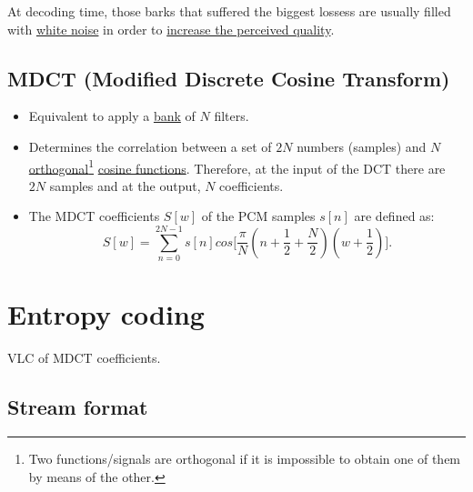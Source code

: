 At decoding time, those barks that suffered the biggest lossess are
usually filled with
\href{http://en.wikipedia.org/wiki/White_noise}{white noise} in order to
\href{http://simplynoise.com/}{increase the perceived
    quality}.

\subsection{MDCT (Modified Discrete Cosine Transform)}
\begin{itemize}
\item
  Equivalent to apply a
  \href{http://en.wikipedia.org/wiki/Filter_bank}{bank} of \(N\)
  filters.
\item
  Determines the correlation between a set of \(2N\) numbers (samples)
  and \(N\)
  \href{http://en.wikipedia.org/wiki/Orthogonality}{orthogonal}\footnote{Two
    functions/signals are orthogonal if it is impossible to obtain one
    of them by means of the other.}
  \href{http://guru.multimedia.cx/mdct/}{cosine functions}. Therefore,
  at the input of the DCT there are \(2N\) samples and at the output,
  \(N\) coefficients.
\item
  The MDCT coefficients \(S[w]\) of the PCM samples \(s[n]\) are defined
  as:
   \begin{equation}
    S[w] = \sum_{n=0}^{2N-1}s[n]cos\Big[\frac{\pi}{N}(n+\frac{1}{2}+\frac{N}{2})(w+\frac{1}{2})\Big].
    \label{eq:MDCT}
  \end{equation}
\end{itemize}

\section{Entropy coding}
VLC of MDCT coefficients.

\subsection{Stream format}


